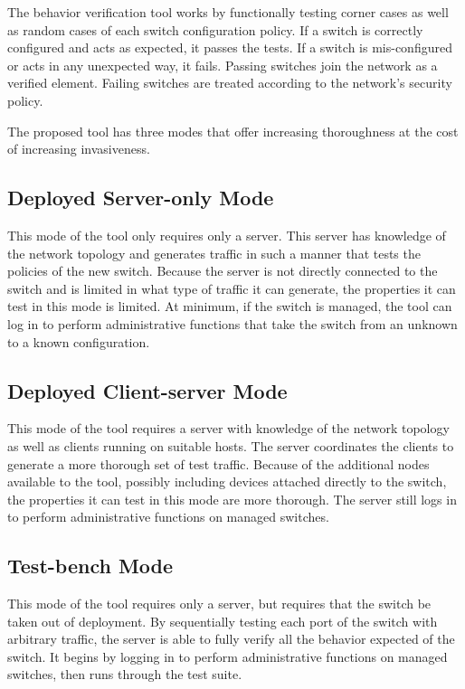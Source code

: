 \documentclass[journal]{IEEEtran}
\begin{document}
The behavior verification tool works by functionally testing corner cases as well as random cases
of each switch configuration policy. If a switch is correctly configured and acts as expected, it
passes the tests. If a switch is mis-configured or acts in any unexpected way, it fails. Passing
switches join the network as a verified element. Failing switches are treated according to the
network's security policy.

The proposed tool has three modes that offer increasing thoroughness at the cost of increasing
invasiveness.

\subsection{Deployed Server-only Mode}
This mode of the tool only requires only a server. This server has knowledge of
the network topology and generates traffic in such a manner that tests the policies of the new
switch. Because the server is not directly connected to the switch and is limited in what type of
traffic it can generate, the properties it can test in this mode is limited. At minimum, if the
switch is managed, the tool can log in to perform administrative functions that take the switch
from an unknown to a known configuration.

\subsection{Deployed Client-server Mode}
This mode of the tool requires a server with knowledge of the network topology as well as clients
running on suitable hosts. The server coordinates the clients to generate a more thorough set of
test traffic. Because of the additional nodes available to the tool, possibly including devices
attached directly to the switch, the properties it can test in this mode are more thorough. The
server still logs in to perform administrative functions on managed switches.

\subsection{Test-bench Mode}
This mode of the tool requires only a server, but requires that the switch be taken out of
deployment. By sequentially testing each port of the switch with arbitrary traffic, the server is
able to fully verify all the behavior expected of the switch. It begins by logging in to perform
administrative functions on managed switches, then runs through the test suite.
\end{document}

